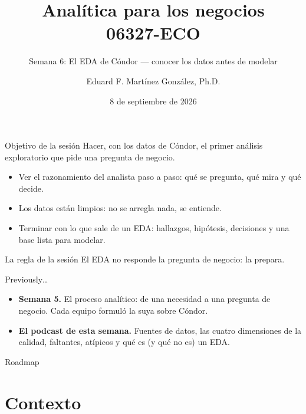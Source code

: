 \documentclass{beamer}
\title[06327-ECO]{Analítica para los negocios \\ 06327-ECO}
\subtitle{Semana 6: El EDA de Cóndor --- conocer los datos antes de modelar}
\author{Eduard F. Martínez González, Ph.D.}
\institute[]{Departamento de Economía, Universidad Icesi}
\date{8 de septiembre de 2026}
\begin{document}
\begin{frame}
\titlepage
\end{frame}

\begin{frame}{Objetivo de la sesión}
\small
Hacer, con los datos de Cóndor, el primer análisis exploratorio que pide una pregunta de negocio.

\vspace{0.2cm}
\begin{itemize} \setlength{\itemsep}{0.18cm}
  \item Ver el razonamiento del analista paso a paso: qué se pregunta, qué mira y qué decide.
  \item Los datos están limpios: no se arregla nada, se entiende.
  \item Terminar con lo que sale de un EDA: hallazgos, hipótesis, decisiones y una base lista para modelar.
\end{itemize}

\vspace{0.2cm}
\begin{block}{La regla de la sesión}
El EDA no responde la pregunta de negocio: la prepara.
\end{block}
\end{frame}

\begin{frame}{Previously\ldots}
\small
\begin{itemize} \setlength{\itemsep}{0.25cm}
  \item \textbf{Semana 5.} El proceso analítico: de una necesidad a una pregunta de negocio. Cada equipo formuló la suya sobre Cóndor.
  \item \textbf{El podcast de esta semana.} Fuentes de datos, las cuatro dimensiones de la calidad, faltantes, atípicos y qué es (y qué no es) un EDA.
\end{itemize}
\end{frame}

\begin{frame}[noframenumbering]{Roadmap}
\tableofcontents
\end{frame}

\section{Contexto}
\end{document}
